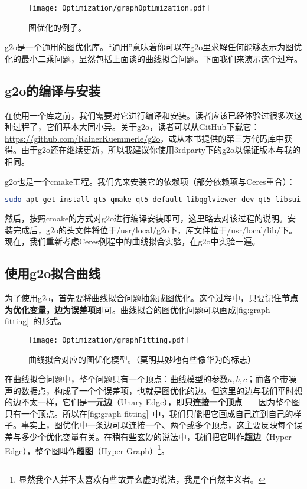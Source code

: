 \begin{figure}[!ht]
	\centering
	\texttt{[image: Optimization/graphOptimization.pdf]}
	\caption{图优化的例子。}
	\label{fig:graph-optimization}
\end{figure}

g2o是一个通用的图优化库。“通用”意味着你可以在g2o里求解任何能够表示为图优化的最小二乘问题，显然包括上面谈的曲线拟合问题。下面我们来演示这个过程。

\subsection{g2o的编译与安装}
在使用一个库之前，我们需要对它进行编译和安装。读者应该已经体验过很多次这种过程了，它们基本大同小异。关于g2o，读者可以从GitHub下载它：\url{https://github.com/RainerKuemmerle/g2o}，或从本书提供的第三方代码库中获得。由于g2o还在继续更新，所以我建议你使用3rdparty下的g2o以保证版本与我的相同。

g2o也是一个cmake工程。我们先来安装它的依赖项（部分依赖项与Ceres重合）：
\begin{lstlisting}[language=sh,caption=终端输入：]
sudo apt-get install qt5-qmake qt5-default libqglviewer-dev-qt5 libsuitesparse-dev libcxsparse3 libcholmod3
\end{lstlisting}

然后，按照cmake的方式对g2o进行编译安装即可，这里略去对该过程的说明。安装完成后，g2o的头文件将位于/usr/local/g2o下，库文件位于/usr/local/lib/下。现在，我们重新考虑Ceres例程中的曲线拟合实验，在g2o中实验一遍。

\subsection{使用g2o拟合曲线}
为了使用g2o，首先要将曲线拟合问题抽象成图优化。这个过程中，只要记住\textbf{节点为优化变量，边为误差项}即可。曲线拟合的图优化问题可以画成\autoref{fig:graph-fitting}~的形式。

\begin{figure}[!ht]
	\centering
	\texttt{[image: Optimization/graphFitting.pdf]}
	\caption{曲线拟合对应的图优化模型。（莫明其妙地有些像华为的标志）}
	\label{fig:graph-fitting}
\end{figure}

在曲线拟合问题中，整个问题只有一个顶点：曲线模型的参数$a,b,c$；而各个带噪声的数据点，构成了一个个误差项，也就是图优化的边。但这里的边与我们平时想的边不太一样，它们是\textbf{一元边}（Unary Edge），即\textbf{只连接一个顶点}——因为整个图只有一个顶点。所以在\autoref{fig:graph-fitting}~中，我们只能把它画成自己连到自己的样子。事实上，图优化中一条边可以连接一个、两个或多个顶点，这主要反映每个误差与多少个优化变量有关。在稍有些玄妙的说法中，我们把它叫作\textbf{超边}（Hyper Edge），整个图叫作\textbf{超图}（Hyper Graph）\footnote{显然我个人并不太喜欢有些故弄玄虚的说法，我是个自然主义者。}。

